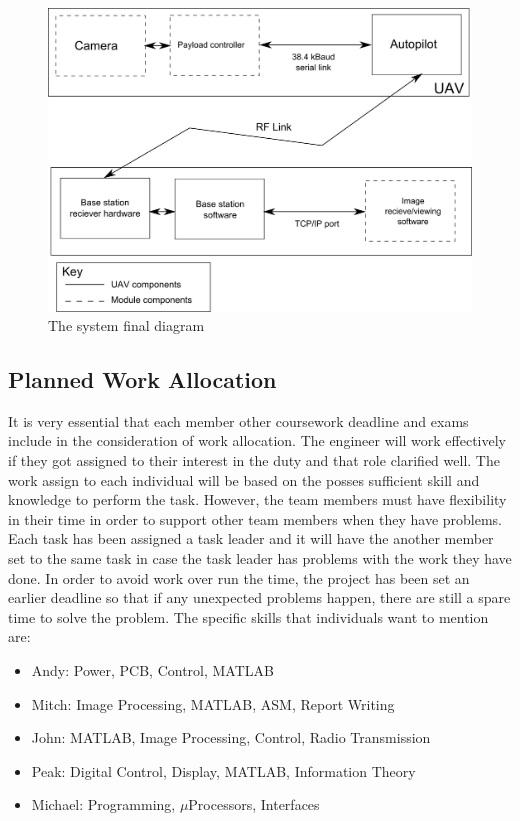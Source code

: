 \begin{figure}[!hbtp]
\begin{center}
\includegraphics[scale=0.6]{figures/spec_block_diagram_2.png} 
\caption{The system final diagram\label{systemBlocD}}
\end{center}
\end{figure}


\subsection{Planned Work Allocation}
 It is very essential that each member other coursework deadline and exams include in the consideration of work allocation. 
The engineer will work effectively if they got assigned  to their interest in the duty and that role clarified well. The work assign to each individual will be based on the posses sufficient skill and knowledge to perform the task. However, the team members must have flexibility in their time in order to support other team members when they have problems. Each task has been assigned a task leader and it will have the another member set to the same task in case the task leader has problems with the work they have done. In order to avoid work over run the time, the project has been set an earlier deadline so that if any unexpected problems happen, there are still a spare time to solve the problem. The specific skills that individuals want to mention are:

\begin{itemize}
\item Andy: Power, PCB, Control, MATLAB
\item Mitch: Image Processing, MATLAB, ASM, Report Writing
\item John: MATLAB, Image Processing, Control, Radio Transmission
\item Peak: Digital Control, Display, MATLAB, Information Theory
\item Michael: Programming, $\mu$Processors, Interfaces
\end{itemize}

